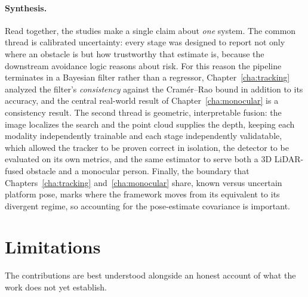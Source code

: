 \paragraph*{Synthesis.}
Read together, the studies make a single claim about \emph{one} system. The
common thread is calibrated uncertainty: every stage was designed to report not
only where an obstacle is but how trustworthy that estimate is, because the
downstream avoidance logic reasons about risk. For this reason the pipeline
terminates in a Bayesian filter rather than a regressor,
Chapter~\ref{cha:tracking} analyzed the filter's \emph{consistency} against the
Cram\'er--Rao bound in addition to its accuracy, and the central real-world
result of Chapter~\ref{cha:monocular} is a consistency result. The second thread
is geometric, interpretable fusion: the image localizes the search and the point
cloud supplies the depth, keeping each modality independently trainable and each
stage independently validatable, which allowed the tracker to be
proven correct in isolation, the detector to be evaluated on its own metrics, and
the same estimator to serve both a 3D LiDAR-fused obstacle and a monocular person.
Finally, the boundary that
Chapters~\ref{cha:tracking} and~\ref{cha:monocular} share, known versus uncertain
platform pose, marks where the framework moves from its equivalent to its
divergent regime, so accounting for the pose-estimate covariance is important.

\section{Limitations}

The contributions are best understood alongside an honest account of what the
work does not yet establish.

